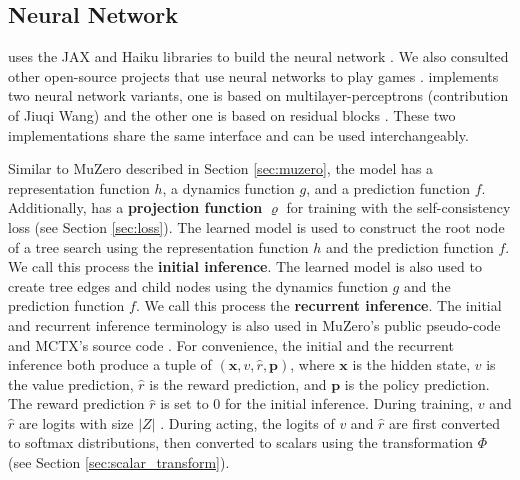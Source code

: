 \subsection{\moozi Neural Network} \label{sec:nn}
\moozi uses the JAX and Haiku libraries to build the neural network \cite{HaikuSonnetJAX_Hennigan.Cai.ea_2020,CompilingMachineLearning_Frostig.Johnson.ea_2019,JAXComposableTransformations_JamesBradbury.RoyFrostig.ea_2018}.
We also consulted other open-source projects that use neural networks to play games \cite{MuZeroGeneral_Duvaud.AureleHainaut_2022, MasteringAtariGames_Ye.Liu.ea_2021, AcceleratingSelfPlayLearning_Wu_2020}.
\moozi implements two neural network variants, one is based on multilayer-perceptrons (contribution of Jiuqi Wang) and the other one is based on residual blocks \cite{DeepResidualLearning_He.Zhang.ea_2016}.
These two implementations share the same interface and can be used interchangeably.

Similar to MuZero described in Section \ref{sec:muzero}, the model has a representation function $h$, a dynamics function $g$, and a prediction function $f$.
Additionally, \moozi has a \textbf{projection function} $\varrho$ for training with the self-consistency loss (see Section \ref{sec:loss}).
The learned model is used to construct the root node of a tree search using the representation function $h$ and the prediction function $f$.
We call this process the \textbf{initial inference}.
The learned model is also used to create tree edges and child nodes using the dynamics function $g$ and the prediction function $f$.
We call this process the \textbf{recurrent inference}.
The initial and recurrent inference terminology is also used in MuZero's public pseudo-code and MCTX's source code \cite{MasteringChessShogi_Silver.Hubert.ea_2017,MctxMCTSinJAX__2022}.
For convenience, the initial and the recurrent inference both produce a tuple of $(\mathbf{x}, v, \hat{r}, \mathbf{p})$, where $\mathbf{x}$ is the hidden state, $v$ is the value prediction, $\hat{r}$ is the reward prediction, and $\mathbf{p}$ is the policy prediction.
The reward prediction $\hat{r}$ is set to 0 for the initial inference.
During training, $v$ and $\hat{r}$ are logits with size $|Z|$ .
During acting, the logits of $v$ and $\hat{r}$ are first converted to softmax distributions, then converted to scalars using the transformation $\Phi$ (see Section \ref{sec:scalar_transform}).


